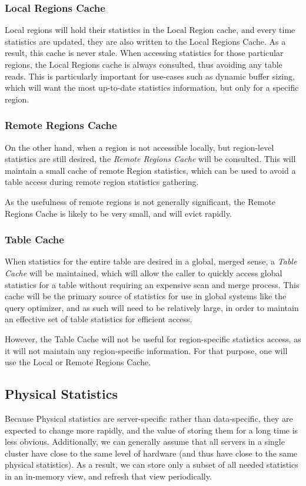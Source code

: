 \subsubsection{Local Regions Cache}
Local regions will hold their statistics in the Local Region cache, and every time statistics are updated, they are also written to the Local Regions Cache. As a result, this cache is never stale. When accessing statistics for those particular regions, the Local Regions cache is always consulted, thus avoiding any table reads. This is particularly important for use-cases such as dynamic buffer sizing, which will want the most up-to-date statistics information, but only for a specific region.

\subsubsection{Remote Regions Cache}
On the other hand, when a region is not accessible locally, but region-level statistics are still desired, the \emph{Remote Regions Cache} will be consulted. This will maintain a small cache of remote Region statistics, which can be used to avoid a table access during remote region statistics gathering.

As the usefulness of remote regions is not generally significant, the Remote Regions Cache is likely to be very small, and will evict rapidly.

\subsubsection{Table Cache}
When statistics for the entire table are desired in a global, merged sense, a \emph{Table Cache} will be maintained, which will allow the caller to quickly access global statistics for a table without requiring an expensive scan and merge process. This cache will be the primary source of statistics for use in global systems like the query optimizer, and as such will need to be relatively large, in order to maintain an effective set of table statistics for efficient access.

However, the Table Cache will not be useful for region-specific statistics access, as it will not maintain any region-specific information. For that purpose, one will use the Local or Remote Regions Cache.

\subsection{Physical Statistics}
Because Physical statistics are server-specific rather than data-specific, they are expected to change more rapidly, and the value of storing them for a long time is less obvious. Additionally, we can generally assume that all servers in a single cluster have close to the same level of hardware (and thus have close to the same physical statistics). As a result, we can store only a subset of all needed statistics in an in-memory view, and refresh that view periodically. 

